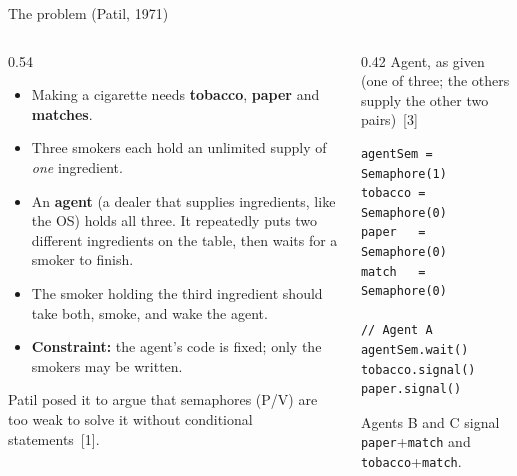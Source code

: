 \documentclass[aspectratio=169,11pt]{beamer}
\begin{document}
\begin{frame}[fragile]{The \Smk{} problem (Patil, 1971)}
  \begin{columns}[T]
    \begin{column}{0.54\textwidth}
      \small
      \begin{itemize}
        \item Making a cigarette needs \textbf{tobacco}, \textbf{paper} and \textbf{matches}.
        \item Three smokers each hold an unlimited supply of \emph{one} ingredient.
        \item An \textbf{agent} (a dealer that supplies ingredients, like
              the OS) holds all three. It repeatedly puts two different
              ingredients on the table, then waits for a smoker to finish.
        \item The smoker holding the third ingredient should take both, smoke,
              and wake the agent.
        \item \textbf{Constraint:} the agent's code is fixed; only the
              smokers may be written.
      \end{itemize}
      \vspace{0.3em}
      {\footnotesize Patil posed it to argue that semaphores (P/V) are too weak
      to solve it without conditional statements~[1].}
    \end{column}
    \begin{column}{0.42\textwidth}
      {\footnotesize\color{muted} Agent, as given (one of three; the others
      supply the other two pairs)~[3]}
\begin{lstlisting}
agentSem = Semaphore(1)
tobacco = Semaphore(0)
paper   = Semaphore(0)
match   = Semaphore(0)

// Agent A
agentSem.wait()
tobacco.signal()
paper.signal()
\end{lstlisting}
      {\footnotesize\color{muted} Agents B and C signal
      \texttt{paper}+\texttt{match} and \texttt{tobacco}+\texttt{match}.}
    \end{column}
  \end{columns}
\end{frame}
\end{document}
